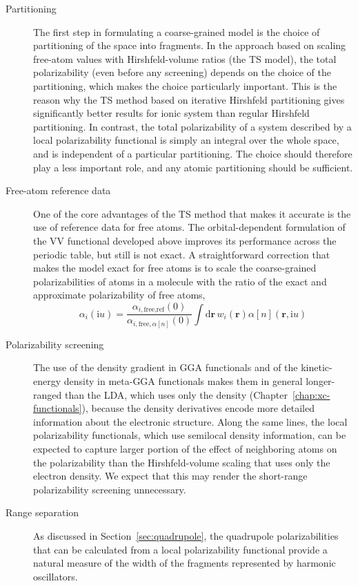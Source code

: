 \begin{description}
\item[Partitioning] The first step in formulating a coarse-grained model is the choice of partitioning of the space into fragments.
In the approach based on scaling free-atom values with Hirshfeld-volume ratios (the TS model), the total polarizability (even before any screening) depends on the choice of the partitioning, which makes the choice particularly important.
This is the reason why the TS method based on iterative Hirshfeld partitioning gives significantly better results for ionic system than regular Hirshfeld partitioning.
In contrast, the total polarizability of a system described by a local polarizability functional is simply an integral over the whole space, and is independent of a particular partitioning.
The choice should therefore play a less important role, and any atomic partitioning should be sufficient.
\item[Free-atom reference data] One of the core advantages of the TS method that makes it accurate is the use of reference data for free atoms.
The orbital-dependent formulation of the VV functional developed above improves its performance across the periodic table, but still is not exact.
A straightforward correction that makes the model exact for free atoms is to scale the coarse-grained polarizabilities of atoms in a molecule with the ratio of the exact and approximate polarizability of free atoms,
\begin{equation}
  \alpha_i(\mathrm iu)=\frac{\alpha_{i,\text{free,ref}}(0)}{\alpha_{i,\text{free},\alpha[n]}(0)}\int\mathrm d\mathbf r\,w_i(\mathbf r)\alpha[n](\mathbf r,\mathrm iu)
\end{equation}
\item[Polarizability screening] The use of the density gradient in GGA functionals and of the kinetic-energy density in meta-GGA functionals makes them in general longer-ranged than the LDA, which uses only the density (Chapter~\ref{chap:xc-functionals}), because the density derivatives encode more detailed information about the electronic structure.
Along the same lines, the local polarizability functionals, which use semilocal density information, can be expected to capture larger portion of the effect of neighboring atoms on the polarizability than the Hirshfeld-volume scaling that uses only the electron density.
We expect that this may render the short-range polarizability screening unnecessary.
\item[Range separation] As discussed in Section~\ref{sec:quadrupole}, the quadrupole polarizabilities that can be calculated from a local polarizability functional provide a natural measure of the width of the fragments represented by harmonic oscillators.

\end{description}
